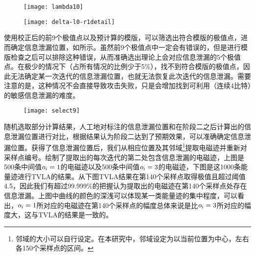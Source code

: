 {	%
	
	\begin{figure}[!h]
		\begin{center}
			\texttt{[image: lambda10]}
			\label{fig:lambda10}
		\end{center}
	\end{figure}
	
	\begin{figure}[!h]
		\begin{center}
			\texttt{[image: delta-l0-r1detail]}
			\label{fig:delta-l0-r1detail}
		\end{center}
	\end{figure}

	使用校正后的前9个极值点以及预计算的模版，可以筛选出符合模版的极值点，进而确定信息泄漏位置，如所示。虽然前9个极值点中一定会有错误的，但是进行模版检查之后可以排除这种错误，从而准确选出理论上会对应信息泄漏的5个极值点。在极少的情况下（占所有情况的比例少于5\%），找不到符合模版的极值点，因此无法确定某一次迭代的信息泄漏位置，也就无法恢复此次迭代的信息泄漏。需要注意的是，这种情况不会直接导致攻击失败，只是会增加找到可利用（连续4比特）的敏感信息泄漏的难度。
	
	\begin{figure}[!h]
		\begin{center}
			\texttt{[image: select9]}
			\label{fig:select9}
		\end{center}
	\end{figure}

	随机选取部分计算结果，人工地对标注的信息泄漏位置和在阶段二之后计算出的信息泄漏位置进行对比，根据结果认为阶段二达到了预期效果，可以准确确定信息泄漏位置。获得了信息泄漏位置后，我们从相应位置及其邻域\footnote{邻域的大小可以自行设定。在本研究中，邻域设定为以当前位置为中心，左右各150个采样点的区间。}提取电磁迹并重新对采样点编号。绘制了提取出的每次迭代的第二处包含信息泄漏的电磁迹，上图是500条中间值$o_i=1$的电磁迹以及500条中间值$o_i=3$的电磁迹，下图是这1000条能量迹进行TVLA的结果。从下图TVLA结果在第140个采样点取得极值且超过阈值4.5，因此我们有超过99.999\%的把握认为提取出的电磁迹在第140个采样点处存在信息泄漏。上图中曲线的颜色的深浅可以体现某一类能量迹的集中程度，可以看出，$o_i=1$所对应的电磁迹在第140个采样点的幅度总体来说是比$o_i=3$所对应的幅度大，这与TVLA的结果是一致的。
	
}
